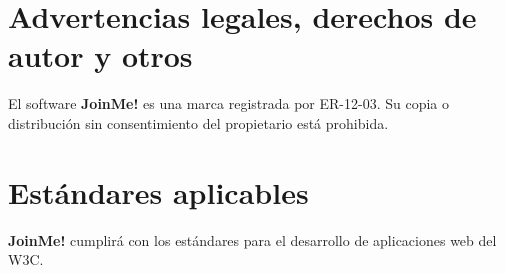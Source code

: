 \documentclass[12pt, a4paper, titlepage]{article}
\begin{document}
\section{Advertencias legales, derechos de autor y otros}

El software \textbf{JoinMe!} es una marca registrada por ER-12-03. Su copia o distribución sin consentimiento del propietario está prohibida.

\section{Estándares aplicables}

\textbf{JoinMe!} cumplirá con los estándares para el desarrollo de aplicaciones web del W3C.
\end{document}
